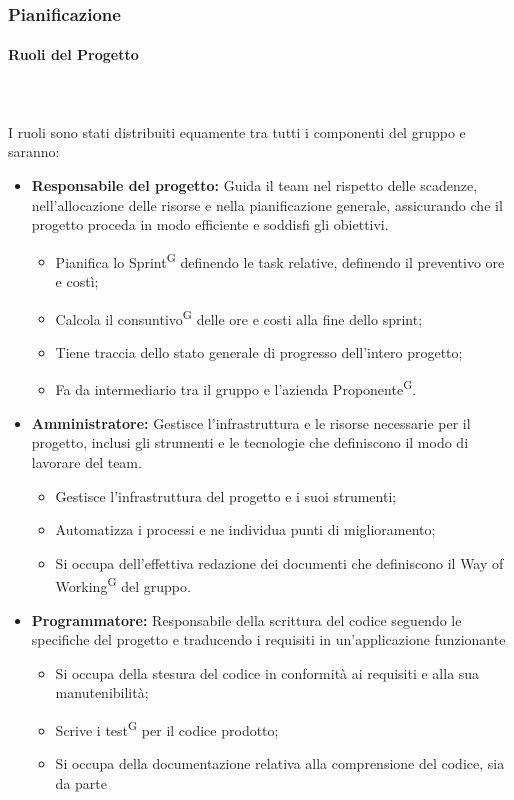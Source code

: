 \documentclass[8pt]{article}
\newcommand{\glossterm}[1]{#1\textsuperscript{G}} %
\newcommand{\subsubsubsection}[1]{\paragraph{#1}\mbox{}\\}
\begin{document}
\subsubsection{Pianificazione} \label{sec:pianificazione}
\subsubsubsection{Ruoli del Progetto}\\
I ruoli sono stati distribuiti equamente tra tutti i componenti del gruppo e saranno:
\begin{itemize}
	\item \textbf{Responsabile del progetto:} Guida il team nel rispetto delle scadenze, nell'allocazione delle risorse e nella pianificazione generale, assicurando che il progetto proceda in modo efficiente e soddisfi gli obiettivi.
	\begin{itemize}
    \item Pianifica lo \glossterm{Sprint} definendo le task relative, definendo il preventivo ore e
        costì;
    \item Calcola il \glossterm{consuntivo} delle ore e costi alla fine dello sprint;
    \item Tiene traccia dello stato generale di progresso dell'intero progetto;
    \item Fa da intermediario tra il gruppo e l'azienda \glossterm{Proponente}.
  \end{itemize}
	\item \textbf{Amministratore:} Gestisce l'infrastruttura e le risorse necessarie per il progetto, inclusi gli strumenti e le tecnologie che definiscono il modo di lavorare del team.
	\begin{itemize}
    \item Gestisce l'infrastruttura del progetto e i suoi strumenti;
    \item Automatizza i processi e ne individua punti di miglioramento;
    \item Si occupa dell'effettiva redazione dei documenti che definiscono il \glossterm{Way of
        Working} del gruppo.
	\end{itemize}
  \item \textbf{Programmatore:} Responsabile della scrittura del codice seguendo le specifiche del progetto e traducendo i requisiti in un'applicazione funzionante
	\begin{itemize}
    \item Si occupa della stesura del codice in conformità ai requisiti e alla sua manutenibilità;
    \item Scrive i \glossterm{test} per il codice prodotto;
    \item Si occupa della documentazione relativa alla comprensione del codice, sia da parte

\end{itemize}
\end{itemize}
\end{document}
